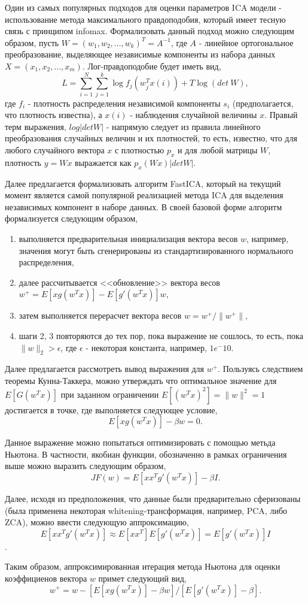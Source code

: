 \documentclass[runningheads]{llncs}
\begin{document}
Один из самых популярных подходов для оценки параметров ICA модели - использование метода максимального правдоподобия, который имеет тесную связь с принципом infomax. Формализовать данный подход можно следующим образом, пусть $W = (w_1, w_2, ..., w_k)^T = A^{-1}$, где $A$ - линейное ортогональное преобразование, выделяющее независимые компоненты из набора данных $X = (x_1, x_2, ..., x_m)$. Лог-правдоподобие будет иметь вид, $$L = \sum_{i=1}^{N}\sum_{j=1}^{k}\log{f_j(w_j^{T}x(i))} + T\log(det\ W),$$
где $f_i$ - плотность распределения независимой компоненты $s_i$ (предполагается, что плотность известна), а $x(i)$ - наблюдения случайной величины $x$. Правый терм выражения, $log |det W|$ - напрямую следует из правила линейного преобразования случайных величин и их плотностей, то есть, известно, что для любого случайного вектора $x$ с плотностью $p_x$ и для любой матрицы $W$, плотность $y = Wx$ выражается как $p_x(Wx)|det W|$. \par
Далее предлагается формализовать алгоритм FastICA, который на текущий момент является самой популярной реализацией метода ICA для выделения независимых компонент в наборе данных. В своей базовой форме алгоритм формализуется следующим образом,

\begin{enumerate}
  \item выполняется предварительная инициализация вектора весов $w$, например, значения могут быть сгенерированы из стандартизированного нормального распределения,
  \item далее рассчитывается <<обновление>> вектора весов $w^+ = E[xg(w^Tx)] - E[g'(w^Tx)]w$,
  \item затем выполняется перерасчет вектора весов $w = w^+/\|w^+\|$,
  \item шаги 2, 3 повторяются до тех пор, пока выражение не сошлось, то есть, пока $\|w\|_2 > \epsilon$, где $\epsilon$ - некоторая константа, например, $1e^-10$.
\end{enumerate}

Далее предлагается рассмотреть вывод выражения для $w^+$. Пользуясь следствием теоремы Кунна-Таккера, можно утверждать что оптимальное значение для $E[G(w^Tx)]$ при заданном ограничении $E[(w^Tx)^2] = \|w\|^2 = 1$ достигается в точке, где выполняется следующее условие,
$$E[xg(w^Tx)] - \beta w = 0.$$ \par
Данное выражение можно попытаться оптимизировать с помощью метьда Ньютона. В частности, якобиан функции, обозначенно в рамках ограничения выше можно выразить следующим образом,
$$JF(w) = E[xx^Tg'(w^Tx)] - \beta I.$$ \par
Далее, исходя из предположения, что данные были предварительно сферизованы (была применена некоторая whitening-трансформация, например, PCA, либо ZCA), можно ввести следующую аппроксимацию, $$E[xx^Tg'(w^Tx)] \approx E[xx^T]E[g'(w^Tx)] = E[g'(w^Tx)]I$$. \par
Таким образом, аппроксимированная итерация метода Ньютона для оценки коэффициенов вектора $w$ примет следующий вид, 
$$w^+ = w - [E[xg(w^Tx)] - \beta w] / [E[g'(w^Tx)] - \beta].$$
\end{document}
